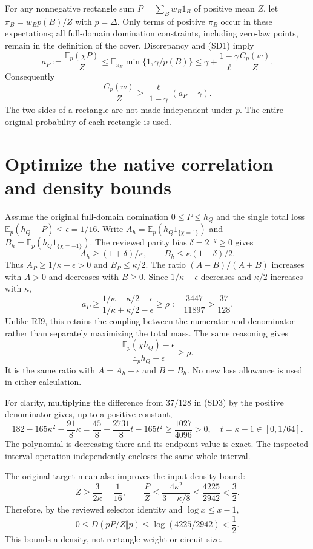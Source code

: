 \documentclass[11pt]{article}
\newcommand{\E}{\mathbb E}
\begin{document}
For any nonnegative rectangle sum $P=\sum_Bw_B1_B$ of positive
mean $Z$, let $\pi_B=w_Bp(B)/Z$ with $p=\Delta$.
Only terms of positive $\pi_B$ occur in these expectations; all
full-domain domination constraints, including zero-law points,
remain in the definition of the cover. Discrepancy and (SD1) imply
\[
 a_P:=\frac{\E_p(\chi P)}Z
 \le\E_{\pi_B}\min\{1,\gamma/p(B)\}
 \le\gamma+\frac{1-\gamma}{\ell}
                     \frac{C_p(w)}Z.
\]
Consequently
\[
             \frac{C_p(w)}Z
               \ge\frac{\ell}{1-\gamma}(a_P-\gamma).
                                                               \tag{SD2}
\]
The two sides of a rectangle are not made independent under $p$.
The entire original probability of each rectangle is used.

\section{Optimize the native correlation and density bounds}
Assume the original full-domain domination $0\le P\le h_Q$ and
the single total loss $\E_p(h_Q-P)\le\epsilon=1/16$.
Write
$A_h=\E_p(h_Q1_{\{\chi=1\}})$ and
$B_h=\E_p(h_Q1_{\{\chi=-1\}})$.
The reviewed parity bias $\delta=2^{-q}\ge0$ gives
\[
 A_h\ge(1+\delta)/\kappa,\qquad
 B_h\le\kappa(1-\delta)/2.
\]
Thus $A_P\ge1/\kappa-\epsilon>0$ and $B_P\le\kappa/2$.
The ratio $(A-B)/(A+B)$ increases with $A>0$ and decreases
with $B\ge0$. Since $1/\kappa-\epsilon$ decreases and $\kappa/2$
increases with $\kappa$,
\[
 a_P\ge
 \frac{1/\kappa-\kappa/2-\epsilon}
      {1/\kappa+\kappa/2-\epsilon}
 \ge \rho:=\frac{3447}{11897}>\frac{37}{128}.         \tag{SD3}
\]
Unlike RI9, this retains the coupling between the numerator and
denominator rather than separately maximizing the total mass.
The same reasoning gives
\[
 \frac{\E_p(\chi h_Q)-\epsilon}{\E_ph_Q-\epsilon}
                              \ge\rho.               \tag{SD4}
\]
It is the same ratio with $A=A_h-\epsilon$ and $B=B_h$.
No new loss allowance is used in either calculation.

For clarity, multiplying the difference from $37/128$ in (SD3)
by the positive denominator gives, up to a positive constant,
\[
 182-165\kappa^2-\frac{91}8\kappa
 =\frac{45}8-\frac{2731}8t-165t^2
 \ge\frac{1027}{4096}>0,\quad
 t=\kappa-1\in[0,1/64].                              \tag{SD5}
\]
The polynomial is decreasing there and its endpoint value is
exact. The inspected interval operation independently encloses
the same whole interval.

The original target mean also improves the input-density bound:
\[
 Z\ge\frac3{2\kappa}-\frac1{16},\qquad
 \frac{P}{Z}\le
 \frac{4\kappa^2}{3-\kappa/8}
 \le\frac{4225}{2942}<\frac32 .
\]
Therefore, by the reviewed selector identity and $\log x\le x-1$,
\[
 0\le D(pP/Z\Vert p)
 \le\log(4225/2942)<\frac12.                          \tag{SD6}
\]
This bounds a density, not rectangle weight or circuit size.
\end{document}

